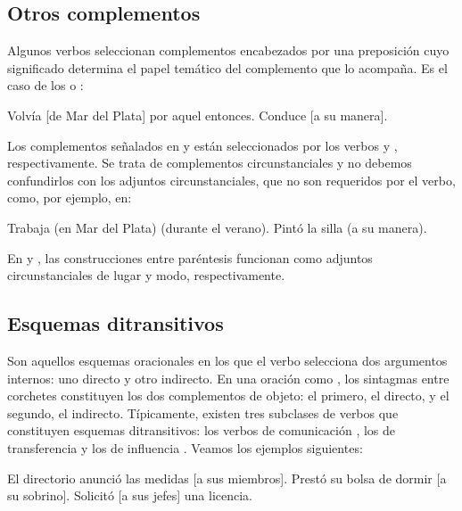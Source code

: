 \subsection{Otros complementos}

Algunos verbos seleccionan complementos encabezados por una preposición cuyo
significado determina el papel temático del complemento que lo acompaña. Es el
caso de los  o :

\begin{exe}
  \ex\label{ex:07-volvia} Volvía [de Mar del Plata] por aquel entonces.
  \ex\label{ex:07-conduce} Conduce [a su manera].
\end{exe}

Los complementos señalados en  y  están
seleccionados por los verbos  y , respectivamente.
Se trata de complementos circunstanciales y no debemos confundirlos con los
adjuntos circunstanciales, que no son requeridos por el verbo, como, por
ejemplo, en:

\begin{exe}
  \ex\label{ex:07-trabaja} Trabaja (en Mar del Plata) (durante el verano).
  \ex\label{ex:07-pinto} Pintó la silla (a su manera).
\end{exe}

En  y , las construcciones entre
paréntesis funcionan como adjuntos circunstanciales de lugar y modo,
respectivamente.

\subsection{Esquemas ditransitivos}\label{sec:07-ditransitivos}

Son aquellos esquemas oracionales en los que el verbo selecciona dos argumentos
internos: uno directo y otro indirecto. En una oración como , los sintagmas entre corchetes
constituyen los dos complementos de objeto: el primero, el directo, y el
segundo, el indirecto. Típicamente, existen tres subclases de verbos que
constituyen esquemas ditransitivos: los verbos de comunicación
, los de transferencia  y los de
influencia . Veamos los ejemplos siguientes:

\begin{exe}
  \ex\label{ex:07-anuncio} El directorio anunció las medidas [a sus miembros].
  \ex\label{ex:07-presto} Prestó su bolsa de dormir [a su sobrino].
  \ex\label{ex:07-solicito} Solicitó [a sus jefes] una licencia.
\end{exe}

